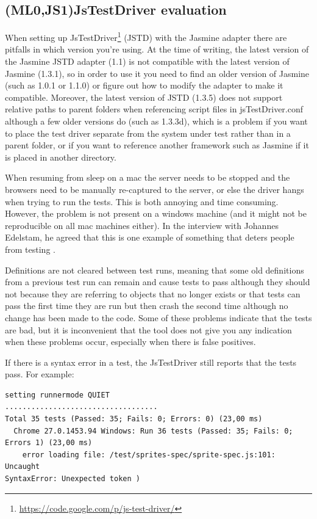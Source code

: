 \documentclass[11pt]{article}
\begin{document}
\subsection{(ML0,JS1)JsTestDriver evaluation}
\label{subsec:jstestdriver}
\label{subsec:jstestdriverintegration}

When setting up JsTestDriver\footnote{\url{https://code.google.com/p/js-test-driver/}} (JSTD) with the Jasmine adapter there are pitfalls in which version you're using. At the time of writing, the latest version of the Jasmine JSTD adapter (1.1) is not compatible with the latest version of Jasmine (1.3.1), so in order to use it you need to find an older version of Jasmine (such as 1.0.1 or 1.1.0) or figure out how to modify the adapter to make it compatible. Moreover, the latest version of JSTD (1.3.5) does not support relative paths to parent folders when referencing script files in jsTestDriver.conf although a few older versions do (such as 1.3.3d), which is a problem if you want to place the test driver separate from the system under test rather than in a parent folder, or if you want to reference another framework such as Jasmine if it is placed in another directory.

When resuming from sleep on a mac the server needs to be stopped and the browsers need to be manually re-captured to the server, or else the driver hangs when trying to run the tests. This is both annoying and time consuming. However, the problem is not present on a windows machine (and it might not be reproducible on all mac machines either). In the interview with Johannes Edelstam, he agreed that this is one example of something that deters people from testing \cite{Edelstam}.

Definitions are not cleared between test runs, meaning that some old definitions from a previous test run can remain and cause tests to pass although they should not because they are referring to objects that no longer exists or that tests can pass the first time they are run but then crash the second time although no change has been made to the code. Some of these problems indicate that the tests are bad, but it is inconvenient that the tool does not give you any indication when these problems occur, especially when there is false positives.

If there is a syntax error in a test, the JsTestDriver still reports that the tests pass. For example:

\begin{verbatim}
setting runnermode QUIET
...................................
Total 35 tests (Passed: 35; Fails: 0; Errors: 0) (23,00 ms)
  Chrome 27.0.1453.94 Windows: Run 36 tests (Passed: 35; Fails: 0;
Errors 1) (23,00 ms)
    error loading file: /test/sprites-spec/sprite-spec.js:101: Uncaught
SyntaxError: Unexpected token )
\end{verbatim}
\end{document}
